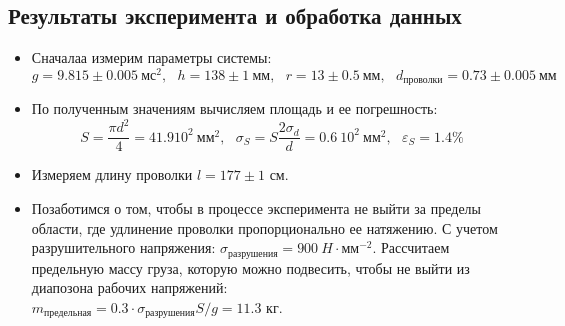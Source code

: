 \documentclass[a4paper,12pt]{article} %
\begin{document}
\subsection{Результаты эксперимента и обработка данных}

\begin{itemize}
    \item Сначалаа измерим параметры системы:
$$g=9.815 \pm 0.005 \ \text{м} \text{с}^2,\ \ \  h=138 \pm 1\ \text{мм},
\ \ \ r = 13 \pm 0.5 \ \text{мм},\ \ \  d_{\text{проволки}}=0.73 \pm 0.005\ \text{мм}$$
 \item По полученным значениям вычисляем площадь и ее погрешность:
$$S=\frac{\pi d^2}{4}= 41.9 10^2 \ \text{мм}^2, \ \ \ \sigma_{S}=S\frac{2 \sigma_{d}}{d} = 0.6 \ 10^2 \ \text{мм}^2, 
\ \ \ \varepsilon _{S}=1.4 \%$$
 \item Измеряем длину проволки $l= 177\pm 1 $ см.\\
 \item Позаботимся о том, чтобы в процессе эксперимента не выйти за пределы области,
где удлинение проволки пропорционально ее натяжению. С учетом разрушительного напряжения:
$\sigma_{\text{разрушения}}= 900 \ H \cdot \text{мм}^{-2}$. Рассчитаем предельную массу груза,
 которую можно подвесить, чтобы не выйти из диапозона рабочих напряжений:\\ $m_{\text{предельная}}
 =0.3\cdot \sigma_{\text{разрушения}}S/g= 11.3 $ кг.


\end{itemize}
\end{document}
